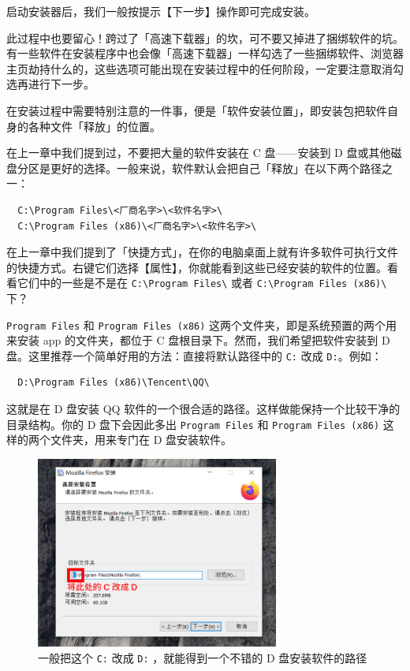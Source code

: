 启动安装器后，我们一般按提示【下一步】操作即可完成安装。

\begin{note}
  此过程中也要留心！跨过了「高速下载器」的坎，可不要又掉进了捆绑软件的坑。有一些软件在安装程序中也会像「高速下载器」一样勾选了一些捆绑软件、浏览器主页劫持什么的，这些选项可能出现在安装过程中的任何阶段，一定要注意取消勾选再进行下一步。
\end{note}

在安装过程中需要特别注意的一件事，便是「软件安装位置」，即安装包把软件自身的各种文件「释放」的位置。

在上一章中我们提到过，不要把大量的软件安装在 C 盘——安装到 D 盘或其他磁盘分区是更好的选择。一般来说，软件默认会把自己「释放」在以下两个路径之一：

\begin{verbatim}
  C:\Program Files\<厂商名字>\<软件名字>\
  C:\Program Files (x86)\<厂商名字>\<软件名字>\
\end{verbatim}

在上一章中我们提到了「快捷方式」，在你的电脑桌面上就有许多软件可执行文件的快捷方式。右键它们选择【属性】，你就能看到这些已经安装的软件的位置。看看它们中的一些是不是在 \verb|C:\Program Files\| 或者 \verb|C:\Program Files (x86)\| 下？

\verb|Program Files| 和 \verb|Program Files (x86)| 这两个文件夹，即是系统预置的两个用来安装 app 的文件夹，都位于 C 盘根目录下。然而，我们希望把软件安装到 D 盘。这里推荐一个简单好用的方法：直接将默认路径中的 \verb|C:| 改成 \verb|D:|。例如：

\begin{verbatim}
  D:\Program Files (x86)\Tencent\QQ\
\end{verbatim}

这就是在 D 盘安装 QQ 软件的一个很合适的路径。这样做能保持一个比较干净的目录结构。你的 D 盘下会因此多出 \verb|Program Files| 和 \verb|Program Files (x86)| 这样的两个文件夹，用来专门在 D 盘安装软件。

\begin{figure}[htb!]
  \centering
  \includegraphics[width=8cm]{assets/Change_C_to_D.png}
  \caption{一般把这个 \texttt{C:} 改成 \texttt{D:} ，就能得到一个不错的 D 盘安装软件的路径}
  \label{change-c-to-d}
\end{figure}

